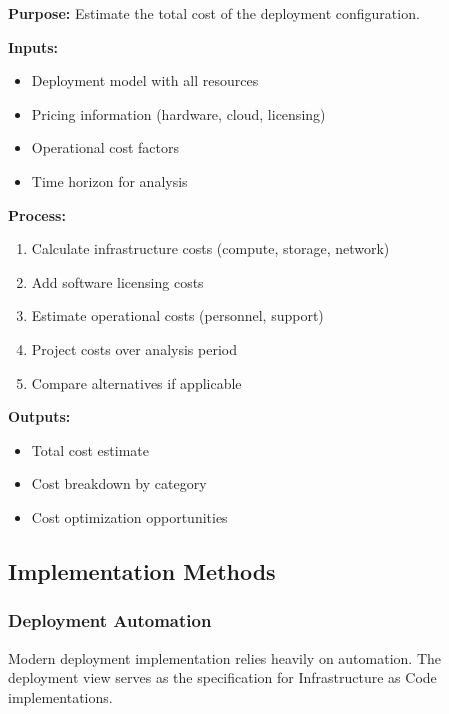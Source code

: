 \documentclass[11pt,letterpaper]{article}
\begin{document}
\begin{definitionbox}
\textbf{Purpose:} Estimate the total cost of the deployment configuration.

\textbf{Inputs:}
\begin{itemize}[nosep]
    \item Deployment model with all resources
    \item Pricing information (hardware, cloud, licensing)
    \item Operational cost factors
    \item Time horizon for analysis
\end{itemize}

\textbf{Process:}
\begin{enumerate}[nosep]
    \item Calculate infrastructure costs (compute, storage, network)
    \item Add software licensing costs
    \item Estimate operational costs (personnel, support)
    \item Project costs over analysis period
    \item Compare alternatives if applicable
\end{enumerate}

\textbf{Outputs:}
\begin{itemize}[nosep]
    \item Total cost estimate
    \item Cost breakdown by category
    \item Cost optimization opportunities
\end{itemize}
\end{definitionbox}

\subsection{Implementation Methods}

\subsubsection{Deployment Automation}

Modern deployment implementation relies heavily on automation. The deployment view serves as the specification for Infrastructure as Code implementations.
\end{document}
